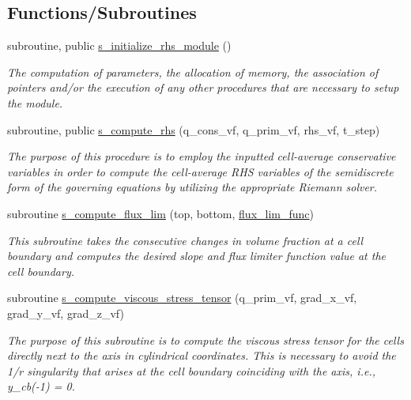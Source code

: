 \subsection*{Functions/\+Subroutines}
\begin{DoxyCompactItemize}
\item 
subroutine, public \hyperlink{namespacem__rhs_ae6f7edb814859919c5d1f739574155bd}{s\+\_\+initialize\+\_\+rhs\+\_\+module} ()
\begin{DoxyCompactList}\small\item\em The computation of parameters, the allocation of memory, the association of pointers and/or the execution of any other procedures that are necessary to setup the module. \end{DoxyCompactList}\item 
subroutine, public \hyperlink{namespacem__rhs_a361f0038973069452cc88430c49bcfe8}{s\+\_\+compute\+\_\+rhs} (q\+\_\+cons\+\_\+vf, q\+\_\+prim\+\_\+vf, rhs\+\_\+vf, t\+\_\+step)
\begin{DoxyCompactList}\small\item\em The purpose of this procedure is to employ the inputted cell-\/average conservative variables in order to compute the cell-\/average R\+HS variables of the semidiscrete form of the governing equations by utilizing the appropriate Riemann solver. \end{DoxyCompactList}\item 
subroutine \hyperlink{namespacem__rhs_aa8bc1b17f230cbd06b702f34bd199ef1}{s\+\_\+compute\+\_\+flux\+\_\+lim} (top, bottom, \hyperlink{namespacem__rhs_a93dc4910f18014dacfb740debe18356d}{flux\+\_\+lim\+\_\+func})
\begin{DoxyCompactList}\small\item\em This subroutine takes the consecutive changes in volume fraction at a cell boundary and computes the desired slope and flux limiter function value at the cell boundary. \end{DoxyCompactList}\item 
subroutine \hyperlink{namespacem__rhs_a2da1b596b26740b8edff160297676447}{s\+\_\+compute\+\_\+viscous\+\_\+stress\+\_\+tensor} (q\+\_\+prim\+\_\+vf, grad\+\_\+x\+\_\+vf, grad\+\_\+y\+\_\+vf, grad\+\_\+z\+\_\+vf)
\begin{DoxyCompactList}\small\item\em The purpose of this subroutine is to compute the viscous stress tensor for the cells directly next to the axis in cylindrical coordinates. This is necessary to avoid the 1/r singularity that arises at the cell boundary coinciding with the axis, i.\+e., y\+\_\+cb(-\/1) = 0. \end{DoxyCompactList}\item 

\end{DoxyCompactItemize}
